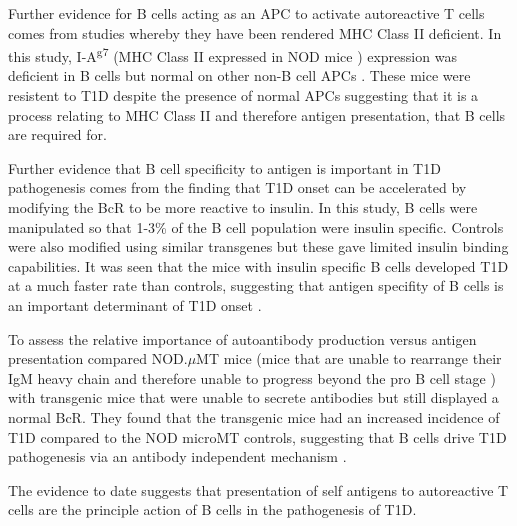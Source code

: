 Further evidence for B cells acting as an APC to activate autoreactive T cells comes from studies whereby they have been rendered MHC Class II deficient.
In this study, I-A\textsuperscript{g7} (MHC Class II expressed in NOD mice \citep{Stratmann2005}) expression was deficient in B cells but normal on other non-B cell APCs \citep{Noorchashm1999}.
These mice were resistent to T1D despite the presence of normal APCs suggesting that it is a process relating to MHC Class II and therefore antigen presentation, that B cells are required for.

Further evidence that B cell specificity to antigen is important in T1D pathogenesis comes from the finding that T1D onset can be accelerated by modifying the BcR to be more reactive to insulin.
In this study, B cells were manipulated so that 1-3\% of the B cell population were insulin specific.
Controls were also modified using similar transgenes but these gave limited insulin binding capabilities.
It was seen that the mice with insulin specific B cells developed T1D at a much faster rate than controls, suggesting that antigen specifity of B cells is an important determinant of T1D onset \citep{Hulbert2001}.

To assess the relative importance of autoantibody production versus antigen presentation \citet{Wong2004} compared NOD.$\mu$MT mice (mice that are unable to rearrange their IgM heavy chain and therefore unable to progress beyond the pro B cell stage ) with transgenic mice that were unable to secrete antibodies but still displayed a normal BcR.
They found that the transgenic mice had an increased incidence of T1D compared to the NOD microMT controls, suggesting that B cells drive T1D pathogenesis via an antibody independent mechanism \citep{Wong2004}.

The evidence to date suggests that presentation of self antigens to autoreactive T cells are the principle action of B cells in the pathogenesis of T1D.





